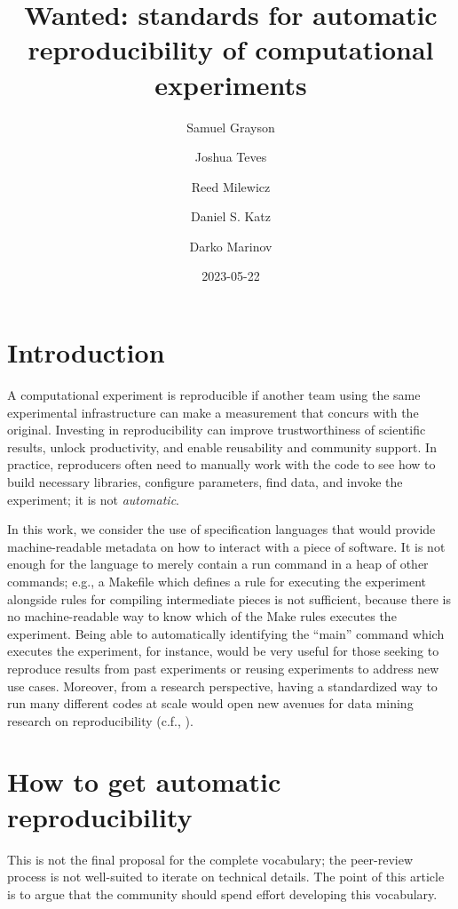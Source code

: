 \documentclass[manuscript,authordraft]{acmart}
\title{Wanted: standards for automatic reproducibility of computational
experiments}
\author{Samuel Grayson}
\affiliation{%
    \institution{University of Illinois Urbana-Champaign}%
    \department{Department of Computer Science}%
    \streetaddress{201 North Goodwin Avenue MC 258}%
    \city{Urbana}%
    \state{IL}%
    \postcode{61801-2302}%
    \country{USA}%
    }
\author{Joshua Teves}
\affiliation{%
    \institution{Sandia National Laboratories}%
    \department{Software Engineering and Research Department}%
    \streetaddress{1515 Eubank Blvd SE1515 Eubank Blvd SE}%
    \city{Albuquerque}%
    \state{NM}%
    \postcode{87123}%
    \country{USA}%
    }
\author{Reed Milewicz}
\affiliation{%
    \institution{Sandia National Laboratories}%
    \department{Software Engineering and Research Department}%
    \streetaddress{1515 Eubank Blvd SE1515 Eubank Blvd SE}%
    \city{Albuquerque}%
    \state{NM}%
    \postcode{87123}%
    \country{USA}%
    }
\author{Daniel S. Katz}
\affiliation{%
    \institution{University of Illinois Urbana-Champaign Department of
Computer Science}%
    \department{Department of Computer Science}\department{National
Center for Supercomputing Applications}\department{Deparment of
Electrical and Computer Engineering}\department{School of Information
Sciences}%
    \streetaddress{201 North Goodwin Avenue MC 258}%
    \city{Urbana}%
    \state{IL}%
    \postcode{61801-2302}%
    \country{USA}%
    }
\author{Darko Marinov}
\affiliation{%
    \institution{University of Illinois Urbana-Champaign}%
    \department{Department of Computer Science}%
    \streetaddress{201 North Goodwin Avenue MC 258}%
    \city{Urbana}%
    \state{IL}%
    \postcode{61801-2302}%
    \country{USA}%
    }
\date{2023-05-22}
\begin{document}
\maketitle

\renewcommand{\shortauthors}{Grayson et al.}


\hypertarget{introduction}{%
\section{Introduction}\label{introduction}}

A computational experiment is reproducible if another team using the
same experimental infrastructure can make a measurement that concurs
with the original. Investing in reproducibility can improve
trustworthiness of scientific results, unlock productivity, and enable
reusability and community support\cite{ivie2018reproducibility}. In
practice, reproducers often need to manually work with the code to see
how to build necessary libraries, configure parameters, find data, and
invoke the experiment; it is not \emph{automatic}.

In this work, we consider the use of specification languages that would
provide machine-readable metadata on how to interact with a piece of
software. It is not enough for the language to merely contain a run
command in a heap of other commands; e.g., a Makefile which defines a
rule for executing the experiment alongside rules for compiling
intermediate pieces is not sufficient, because there is no
machine-readable way to know which of the Make rules executes the
experiment. Being able to automatically identifying the ``main'' command
which executes the experiment, for instance, would be very useful for
those seeking to reproduce results from past experiments or reusing
experiments to address new use cases. Moreover, from a research
perspective, having a standardized way to run many different codes at
scale would open new avenues for data mining research on reproducibility
(c.f., \cite{collberg_repeatability_2016}).

\hypertarget{how-to-get-automatic-reproducibility}{%
\section{How to get automatic
reproducibility}\label{how-to-get-automatic-reproducibility}}

This is not the final proposal for the complete vocabulary; the
peer-review process is not well-suited to iterate on technical details.
The point of this article is to argue that the community should spend
effort developing this vocabulary.
\end{document}
